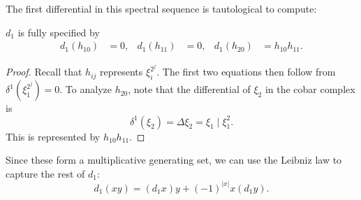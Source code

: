 \begin{subappendices}
The first differential in this spectral sequence is tautological to compute:

\begin{lemma}
$d_1$ is fully specified by
\begin{align*}
d_1(h_{10}) & = 0, &
d_1(h_{11}) & = 0, &
d_1(h_{20}) & = h_{10} h_{11}.
\end{align*}
\end{lemma}
\begin{proof}
Recall that $h_{ij}$ represents $\xi_i^{2^j}$.
The first two equations then follow from $\delta^1(\xi_1^{2^j}) = 0$.
To analyze $h_{20}$, note that the differential of $\xi_2$ in the cobar complex is \[\delta^1(\xi_2) = \Delta \xi_2 = \xi_1 \mid \xi_1^2.\]
This is represented by $h_{10} h_{11}$.
\end{proof}

\noindent
{}
Since these form a multiplicative generating set, we can use the Leibniz law to capture the rest of $d_1$: \[d_1(x y) = (d_1 x) y + (-1)^{|x|} x (d_1 y).\]


\end{subappendices}
